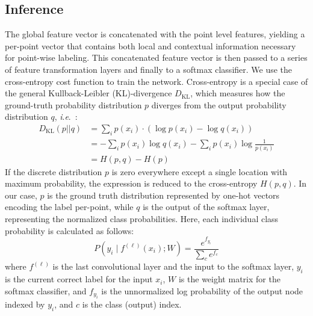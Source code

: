 \documentclass[final,3p,times,twocolumn,authoryear]{elsarticle}
\newcommand{\ie}{\textit{i}.\textit{e}.}
\begin{document}
\subsection{Inference}
\label{sec:inference}
The global feature vector is concatenated with the point level features, yielding a  per-point vector that contains both local and contextual information necessary for point-wise labeling. 
This concatenated feature vector is then passed to a series of feature transformation layers and finally to a softmax classifier. 
We use the cross-entropy cost function to train the network. 
Cross-entropy is a special case of the general Kullback-Leibler (KL)-divergence $D_{\text{KL}}$, which measures how the ground-truth probability distribution $p$ diverges from the output probability distribution $q$, \ie~:
\begin{equation}
\label{eq:6}
\begin{array}{rl}
D_{\text{KL}}(p||q)
    & = \sum^{}_{i} p(x_{i})\cdot(\log p(x_{i}) - \log q(x_{i})) \\
    & = -\sum^{}_{i} p(x_{i}) \log q(x_{i}) -\sum^{}_{i} p(x_{i}) \log \frac{1}{p(x_{i})}  \\
    & = H(p,q) - H(p)
\end{array}
\end{equation}
If the discrete distribution $p$ is zero everywhere except a single location with maximum probability, the expression is reduced to the cross-entropy $H(p,q)$. 
In our case, $p$ is the ground truth distribution represented by one-hot vectors encoding the label per-point, while $q$ is the output of the softmax layer, representing the normalized class probabilities.
Here, each individual class probability is calculated as follows:
\begin{equation} \label{eq:7}
P(y_i \mid f^{(\ell)}(x_i); W) = \frac{e^{f_{y_i}}}{\sum_c e^{f_c} }
\end{equation}
where $f^{(\ell)}$ is the last convolutional layer and the input to the softmax layer, $y_i$ is the current correct label for the input $x_i$, $W$ is the weight matrix for the softmax classifier, and $f_{y_i}$ is the unnormalized log probability of the output node indexed by $y_i$, and $c$ is the class (output) index.
\end{document}
